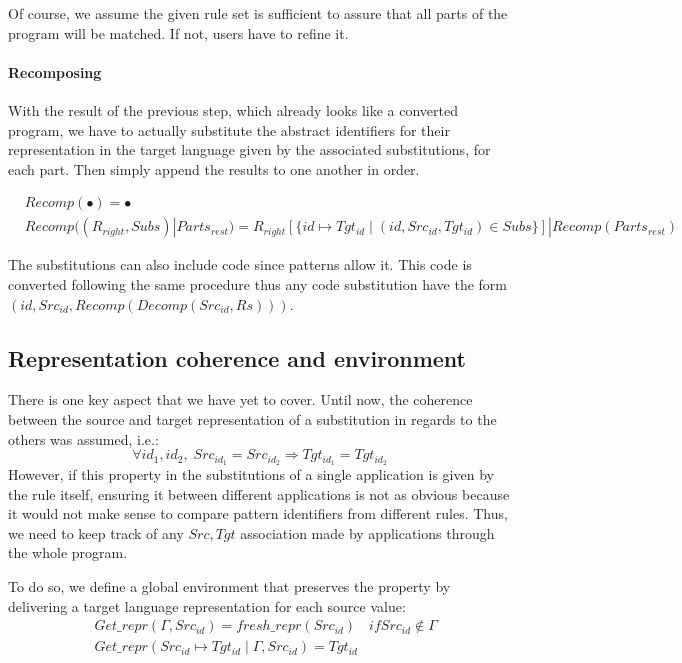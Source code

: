 Of course, we assume the given rule set is sufficient to assure that all parts of the
program will be matched. If not, users have to refine it.

\paragraph{Recomposing}
With the result of the previous step, which already looks like a converted program,
we have to actually substitute the abstract identifiers for their representation
in the target language given by the associated substitutions, for each part.
Then simply append the results to one another in order.

\begin{align*}
& Recomp(\bullet) = \bullet\\
& Recomp((R_{right}, Subs) | Parts_{rest}) = R_{right}[\{id \mapsto Tgt_{id} \mid (id,Src_{id},Tgt_{id})\in Subs\}] | Recomp(Parts_{rest})
\end{align*}

\begin{remark}
The substitutions can also include code since patterns allow it. This code is converted following the same
procedure thus any code substitution have the form $(id,Src_{id},Recomp(Decomp(Src_{id},Rs)))$.
\end{remark}

\subsection{Representation coherence and environment}
There is one key aspect that we have yet to cover. Until now, the coherence between the source and target representation of
a substitution in regards to the others was assumed, i.e.:
\begin{equation*}
\forall id_1,id_2, \; Src_{id_1} = Src_{id_2} \Rightarrow Tgt_{id_1} = Tgt_{id_2}
\end{equation*}
However, if this property in the substitutions of a single application is given by the rule itself,
ensuring it between different applications is not as obvious because it would not make sense to
compare pattern identifiers from different rules. Thus, we need to keep track of any $Src,Tgt$
association made by applications through the whole program.

To do so, we define a global environment that preserves the property by delivering a target
language representation for each source value:
\begin{align*}
& Get\_repr(\Gamma,Src_{id}) = fresh\_repr(Src_{id}) & if Src_{id} \notin \Gamma\\
& Get\_repr(Src_{id}\mapsto Tgt_{id}\mid\Gamma,Src_{id}) = Tgt_{id} &
\end{align*}

